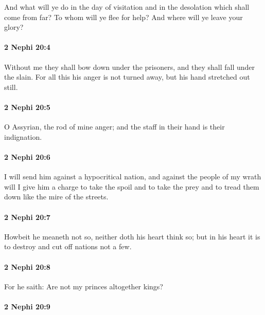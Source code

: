 			And what will ye do in the day of visitation
			and in the desolation which shall come from far?
			To whom will ye flee for help?
			And where will ye leave your glory?

		\paragraph{2 Nephi 20:4} %
			\label{2NEPHI-20-4}

			Without me they shall bow down under the prisoners,
			and they shall fall under the slain.
			For all this his anger is not turned away, but his hand stretched out still.

		\paragraph{2 Nephi 20:5} %
			\label{2NEPHI-20-5}

			O Assyrian, the rod of mine anger;
			and the staff in their hand is their indignation.

		\paragraph{2 Nephi 20:6} %
			\label{2NEPHI-20-6}

			I will send him against a hypocritical nation,
			and against the people of my wrath will I give him a charge
			to take the spoil and to take the prey
			and to tread them down like the mire of the streets.

		\paragraph{2 Nephi 20:7} %
			\label{2NEPHI-20-7}

			Howbeit he meaneth not so,
			neither doth his heart think so;
			but in his heart it is to destroy and cut off nations not a few.

		\paragraph{2 Nephi 20:8} %
			\label{2NEPHI-20-8}

			For he saith:
			Are not my princes altogether kings?

		\paragraph{2 Nephi 20:9} %
			\label{2NEPHI-20-9}

